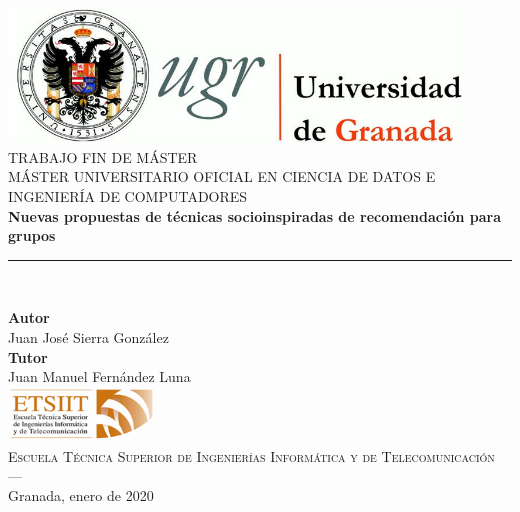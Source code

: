 \begin{titlepage}
 
 
\newlength{\centeroffset}
\setlength{\centeroffset}{-0.5\oddsidemargin}
\addtolength{\centeroffset}{0.5\evensidemargin}
\thispagestyle{empty}

\noindent\hspace*{\centeroffset}\begin{minipage}{\textwidth}

\centering
\includegraphics[width=0.9\textwidth]{imagenes/logo_ugr.jpg}\\[1.4cm]

\textsc{ \Large TRABAJO FIN DE MÁSTER\\[0.2cm]}
\textsc{MÁSTER UNIVERSITARIO OFICIAL EN CIENCIA DE DATOS E INGENIERÍA DE COMPUTADORES}\\[1cm]
% 
{\Huge\bfseries Nuevas propuestas de técnicas socioinspiradas de recomendación para grupos\\
}
\noindent\rule[-1ex]{\textwidth}{2pt}\\[3.5ex]
\end{minipage}

\vspace{2cm}
\noindent\hspace*{\centeroffset}\begin{minipage}{\textwidth}
\centering

\textbf{Autor}\\ {Juan José Sierra González}\\[2.5ex]
\textbf{Tutor}\\
{Juan Manuel Fernández Luna}\\[2cm]
\includegraphics[width=0.3\textwidth]{imagenes/etsiit_logo.png}\\[0.1cm]
\textsc{Escuela Técnica Superior de Ingenierías Informática y de Telecomunicación}\\
\textsc{---}\\
Granada, enero de 2020
\end{minipage}
\end{titlepage}


